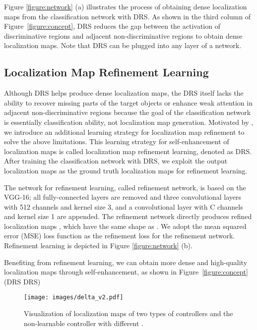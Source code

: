 \documentclass[letterpaper]{article} \usepackage{aaai21}  \usepackage{times}  \usepackage{helvet} \usepackage{courier}  \usepackage[hyphens]{url}  \usepackage{graphicx} \urlstyle{rm} \def\UrlFont{\rm}  \usepackage{natbib}  \usepackage{caption} \frenchspacing  \setlength{\pdfpagewidth}{8.5in}  \setlength{\pdfpageheight}{11in}
\begin{document}
Figure \ref{figure:network} (a) illustrates the process of obtaining dense localization maps from the classification network with DRS.
As shown in the third column of Figure~\ref{figure:concept}, DRS reduces the gap between the activation of discriminative regions and adjacent non-discriminative regions to obtain dense localization maps. 
Note that DRS can be plugged into any layer of a network.


\subsection{Localization Map Refinement Learning} 
\label{method:3}
Although DRS helps produce dense localization maps, the DRS itself lacks the ability to recover missing parts of the target objects or enhance weak attention in adjacent non-discriminative regions because the goal of the classification network is essentially classification ability, not localization map generation.
Motivated by \cite{jiang2019integral}, we introduce an additional learning strategy for localization map refinement to solve the above limitations.
This learning strategy for self-enhancement of localization maps is called localization map refinement learning, denoted as DRS.
After training the classification network with DRS, we exploit the output localization maps  as the ground truth localization maps for refinement learning.	

The network for refinement learning, called refinement network, is based on the VGG-16; all fully-connected layers are removed and three convolutional layers with 512 channels and kernel size 3, and a convolutional layer with C channels and kernel size 1 are appended.
The refinement network directly produces refined localization maps , which have the same shape as .
We adopt the mean squared error (MSE) loss function as the refinement loss for the refinement network.
Refinement learning is depicted in Figure \ref{figure:network} (b).

Benefiting from refinement learning, we can obtain more dense and high-quality localization maps through self-enhancement, as shown in Figure~\ref{figure:concept} (DRS  DRS)


\begin{figure*}[t]
    \centering
    \texttt{[image: images/delta\_v2.pdf]}
    \caption{
        Visualization of localization maps of two types of controllers and the non-learnable controller with different .
    }
    \label{figure:controller}
\end{figure*}
\end{document}

